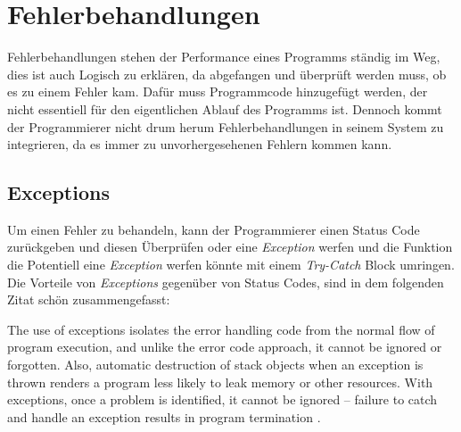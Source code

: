 \section{Fehlerbehandlungen}\label{sec:fehlerbehandlung}
Fehlerbehandlungen stehen der Performance eines Programms ständig im Weg, dies ist auch Logisch
zu erklären, da abgefangen und überprüft werden muss, ob es zu einem Fehler kam. Dafür muss
Programmcode hinzugefügt werden, der nicht essentiell für den eigentlichen Ablauf des Programms
ist. Dennoch kommt der Programmierer nicht drum herum Fehlerbehandlungen in seinem System zu
integrieren, da es immer zu unvorhergesehenen Fehlern kommen kann.

\subsection{Exceptions}\label{subsec:exceptions}
Um einen Fehler zu behandeln, kann der Programmierer einen Status Code zurückgeben und diesen
Überprüfen oder eine \emph{Exception} werfen und die Funktion die Potentiell eine
\emph{Exception} werfen könnte mit einem \emph{Try-Catch} Block umringen. Die Vorteile von
\emph{Exceptions} gegenüber von Status Codes, sind in dem folgenden Zitat schön zusammengefasst:

\begin{zitat}
    The use of exceptions isolates the error handling code from the normal flow of program
    execution, and unlike the error code approach, it cannot be ignored or forgotten. Also,
    automatic destruction of stack objects when an exception is thrown renders a program less likely to leak
    memory or other resources. With exceptions, once a problem is identified, it cannot be ignored –
    failure to catch and handle an exception results in program termination \cite{TechnicalReport}.
\end{zitat}

